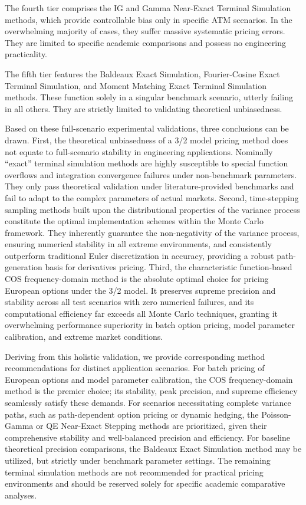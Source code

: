 The fourth tier comprises the IG and Gamma Near-Exact Terminal Simulation methods, which provide controllable bias only in specific ATM scenarios. In the overwhelming majority of cases, they suffer massive systematic pricing errors. They are limited to specific academic comparisons and possess no engineering practicality. 

The fifth tier features the Baldeaux Exact Simulation, Fourier-Cosine Exact Terminal Simulation, and Moment Matching Exact Terminal Simulation methods. These function solely in a singular benchmark scenario, utterly failing in all others. They are strictly limited to validating theoretical unbiasedness.

Based on these full-scenario experimental validations, three conclusions can be drawn. First, the theoretical unbiasedness of a 3/2 model pricing method does not equate to full-scenario stability in engineering applications. Nominally ``exact'' terminal simulation methods are highly susceptible to special function overflows and integration convergence failures under non-benchmark parameters. They only pass theoretical validation under literature-provided benchmarks and fail to adapt to the complex parameters of actual markets. Second, time-stepping sampling methods built upon the distributional properties of the variance process constitute the optimal implementation schemes within the Monte Carlo framework. They inherently guarantee the non-negativity of the variance process, ensuring numerical stability in all extreme environments, and consistently outperform traditional Euler discretization in accuracy, providing a robust path-generation basis for derivatives pricing. Third, the characteristic function-based COS frequency-domain method is the absolute optimal choice for pricing European options under the 3/2 model. It preserves supreme precision and stability across all test scenarios with zero numerical failures, and its computational efficiency far exceeds all Monte Carlo techniques, granting it overwhelming performance superiority in batch option pricing, model parameter calibration, and extreme market conditions.

Deriving from this holistic validation, we provide corresponding method recommendations for distinct application scenarios. For batch pricing of European options and model parameter calibration, the COS frequency-domain method is the premier choice; its stability, peak precision, and supreme efficiency seamlessly satisfy these demands. For scenarios necessitating complete variance paths, such as path-dependent option pricing or dynamic hedging, the Poisson-Gamma or QE Near-Exact Stepping methods are prioritized, given their comprehensive stability and well-balanced precision and efficiency. For baseline theoretical precision comparisons, the Baldeaux Exact Simulation method may be utilized, but strictly under benchmark parameter settings. The remaining terminal simulation methods are not recommended for practical pricing environments and should be reserved solely for specific academic comparative analyses.